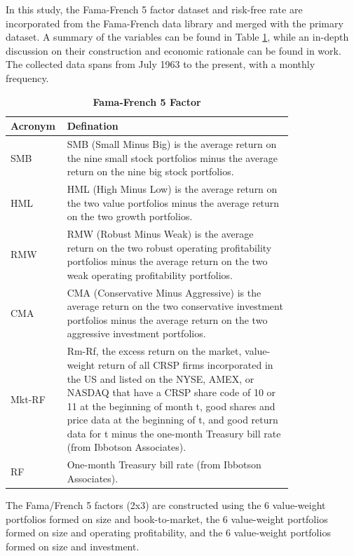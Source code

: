 In this study, the Fama-French 5 factor dataset and risk-free rate are incorporated from the Fama-French data library and merged with the primary dataset. A summary of the variables can be found in Table \ref{table: Fama-French 5 factor}, while an in-depth discussion on their construction and economic rationale can be found in \citet*{fama2015five} work. The collected data spans from July 1963 to the present, with a monthly frequency.

\begin{table}[H]
  \centering
  \footnotesize
  \caption{\textbf{Fama-French 5 Factor}}
  \label{table: Fama-French 5 factor}
  \begin{tabular}{l>{\RaggedRight}p{0.8\linewidth}}
  \hline
      \textbf{Acronym} & \textbf{Defination} \\ \hline
      SMB & SMB (Small Minus Big) is the average return on the nine small stock portfolios minus the average return on the nine big stock portfolios. \\ 
      HML & HML (High Minus Low) is the average return on the two value portfolios minus the average return on the two growth portfolios. \\ 
      RMW & RMW (Robust Minus Weak) is the average return on the two robust operating profitability portfolios minus the average return on the two weak operating profitability portfolios.  \\ 
      CMA & CMA (Conservative Minus Aggressive) is the average return on the two conservative investment portfolios minus the average return on the two aggressive investment portfolios. \\ 
      Mkt-RF & Rm-Rf, the excess return on the market, value-weight return of all CRSP firms incorporated in the US and listed on the NYSE, AMEX, or NASDAQ that have a CRSP share code of 10 or 11 at the beginning of month t, good shares and price data at the beginning of t, and good return data for t minus the one-month Treasury bill rate (from Ibbotson Associates). \\ 
      RF & One-month Treasury bill rate (from Ibbotson Associates). \\ \hline
  \end{tabular}
  \begin{tablenotes}
    \small
    \item The Fama/French 5 factors (2x3) are constructed using the 6 value-weight portfolios formed on size and book-to-market, the 6 value-weight portfolios formed on size and operating profitability, and the 6 value-weight portfolios formed on size and investment.
  \end{tablenotes}
\end{table}


